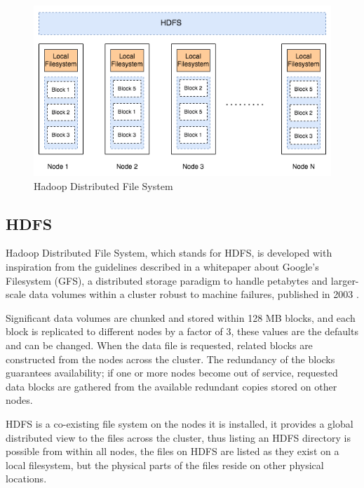 \documentclass[review]{elsarticle}
\begin{document}
\begin{figure}[h!]
	\caption{Hadoop Distributed File System}
	\label{fig:HDFSoverview}
	\includegraphics[width=\textwidth]{HDFSoverview}
	\centering
\end{figure}

\subsection{HDFS}\label{HDFS}
Hadoop Distributed File System, which stands for HDFS, is developed with inspiration from the guidelines described in a whitepaper about Google's Filesystem (GFS), a distributed storage paradigm to handle petabytes and larger-scale data volumes within a cluster robust to machine failures, published in 2003 \cite{ghemawat_google_2003}. 

Significant data volumes are chunked and stored within 128 MB blocks, and each block is replicated to different nodes by a factor of 3, these values are the defaults and can be changed. When the data file is requested, related blocks are constructed from the nodes across the cluster. The redundancy of the blocks guarantees availability; if one or more nodes become out of service, requested data blocks are gathered from the available redundant copies stored on other nodes. 

HDFS is a co-existing file system on the nodes it is installed, it provides a global distributed view to the files across the cluster, thus listing an HDFS directory is possible from within all nodes, the files on HDFS are listed as they exist on a local filesystem, but the physical parts of the files reside on other physical locations. 
\end{document}
